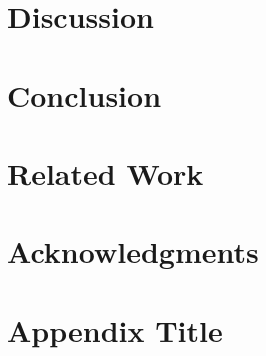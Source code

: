 \documentclass[11pt]{article}
\begin{document}

\section{Discussion}

\section{Conclusion}

\section{Related Work}

\section*{Acknowledgments}




\appendix

\section{Appendix Title}


\end{document}
